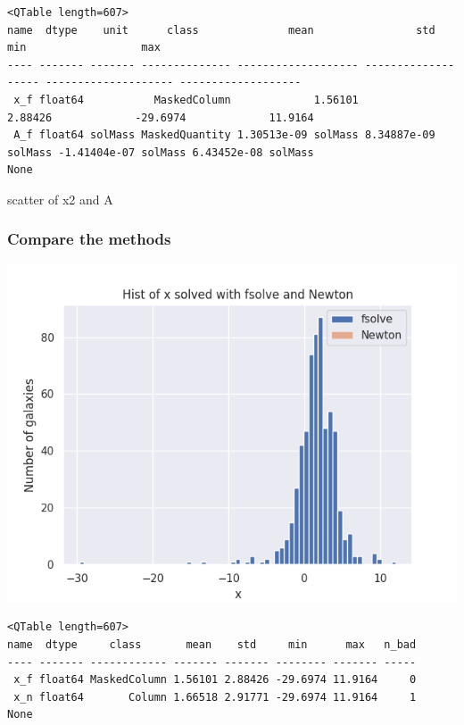 \documentclass[a4paper]{article}
\begin{document}
\begin{verbatim}
<QTable length=607>
name  dtype    unit      class              mean                std                 min                  max        
---- ------- ------- -------------- ------------------- ------------------- -------------------- -------------------
 x_f float64           MaskedColumn             1.56101             2.88426             -29.6974             11.9164
 A_f float64 solMass MaskedQuantity 1.30513e-09 solMass 8.34887e-09 solMass -1.41404e-07 solMass 6.43452e-08 solMass
None
\end{verbatim}


scatter of x2 and A

\subsubsection{Compare the methods}
\label{sec:org31f509c}

\begin{center}
\includegraphics[width=.9\linewidth]{figure/x-hist.png}
\end{center}


\begin{verbatim}
<QTable length=607>
name  dtype     class       mean    std     min      max   n_bad
---- ------- ------------ ------- ------- -------- ------- -----
 x_f float64 MaskedColumn 1.56101 2.88426 -29.6974 11.9164     0
 x_n float64       Column 1.66518 2.91771 -29.6974 11.9164     1
None
\end{verbatim}
\end{document}
